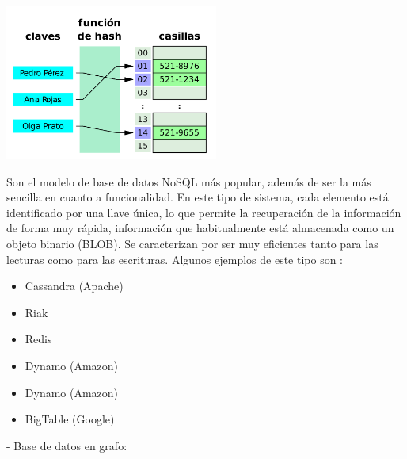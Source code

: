 \documentclass[%
 reprint,
 amsmath,amssymb,
 aps,
]{revtex4-1}
\begin{document}
	\begin{center}
	\includegraphics[width=7cm]{./Imagenes/2}
	\end{center}
Son el modelo de base de datos NoSQL más popular, además de ser la más sencilla en cuanto a funcionalidad. En este tipo de sistema, cada elemento está identificado por una llave única, lo que permite la recuperación de la información de forma muy rápida, información que habitualmente está almacenada como un objeto binario (BLOB). Se caracterizan por ser muy eficientes tanto para las lecturas como para las escrituras.  \cite{acens}
Algunos ejemplos de este tipo son :
           \begin{itemize}
		\item Cassandra (Apache)
		\item Riak
		\item Redis
		\item Dynamo (Amazon)
                     \item Dynamo (Amazon)
                     \item BigTable (Google)
	\end{itemize}
-  Base de datos en grafo:
\\
\\
\end{document}
